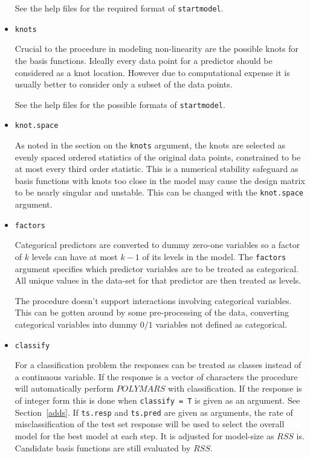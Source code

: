 \begin{itemize}
See the help files for the required format of {\tt startmodel}.

\item {\tt knots}

Crucial to the procedure in modeling non-linearity are the possible
knots for the basis functions. Ideally every data point for a
predictor should be considered as a knot location. However due to
computational expense it is usually better to consider only a subset
of the
data points. 

See the help files for the possible formats of {\tt startmodel}.

\item {\tt knot.space}

As noted in the section on the {\tt knots} argument, the knots
are selected as evenly spaced ordered statistics of the original
data points, constrained to be at most every third order statistic.
This is a numerical stability safeguard as basis functions with knots
too close in the model may cause the design matrix to be nearly
singular and unstable.
This can be changed with the {\tt knot.space} argument.

\item {\tt factors} 

Categorical predictors are converted to dummy
zero-one variables so 
a factor of $k$ levels can have at most $k-1$ of its levels in the
model. The {\tt factors} argument specifies which predictor variables 
are to be
treated as categorical. All unique values in the data-set for that predictor
are then treated as levels.

The procedure doesn't support interactions involving categorical
variables. This can be gotten around by some pre-processing of
the data, converting categorical variables into dummy $0/1$ variables
not defined as categorical. 

\item {\tt classify}

For a classification problem the responses can be treated as classes
instead of a continuous variable. If the response is a vector of
characters the procedure will automatically perform $POLYMARS$ with
classification. If the response is of integer form this is done
when {\tt classify = T} is given as an argument.
See Section~\ref{adds}. If {\tt ts.resp} and {\tt ts.pred}
are given as arguments, the rate of misclassification of the test set
response will be used to select the overall model for the best
model at each step. It is adjusted for model-size as $RSS$
is. Candidate basis functions are still evaluated by $RSS$.



\end{itemize}
